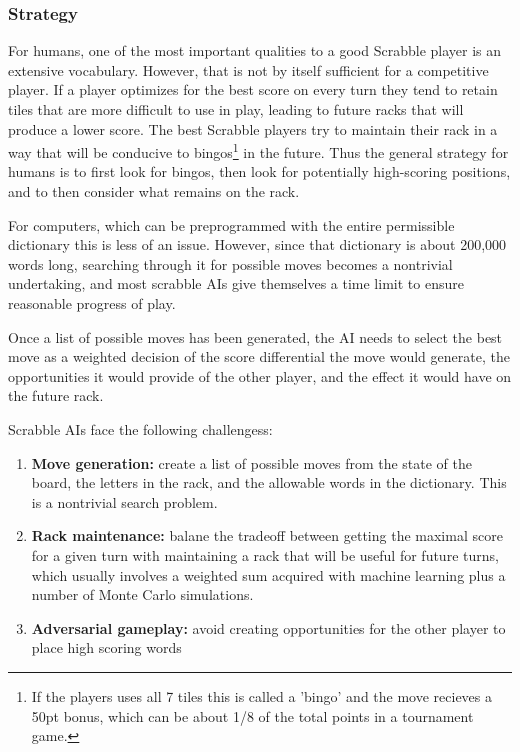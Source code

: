 \documentclass[12pt]{article}
\begin{document}
\subsubsection*{Strategy}

For humans, one of the most important qualities to a good Scrabble
player is an extensive vocabulary. However, that is not by itself
sufficient for a competitive player. If a player optimizes for the
best score on every turn they tend to retain tiles that are more
difficult to use in play, leading to future racks that will produce a
lower score. The best Scrabble players try to maintain their rack in a
way that will be conducive to bingos\footnote{If the players uses all
  7 tiles this is called a 'bingo' and the move recieves a 50pt bonus,
  which can be about 1/8 of the total points in a tournament game.} in
the future. Thus the general strategy for humans is to first look for
bingos, then look for potentially high-scoring positions, and to then
consider what remains on the rack.

For computers, which can be preprogrammed with the entire permissible
dictionary this is less of an issue. However, since that dictionary is
about 200,000 words long, searching through it for possible moves
becomes a nontrivial undertaking, and most scrabble AIs give
themselves a time limit to ensure reasonable progress of play.

Once a list of possible moves has been generated, the AI needs to select
the best move as a weighted decision of the score differential the
move would generate, the opportunities it would provide of the other
player, and the effect it would have on the future rack.

Scrabble AIs face the following challengess:

\begin{enumerate}
  \item \textbf{Move generation:} create a list of possible moves from
    the state of the board, the letters in the rack, and the allowable
    words in the dictionary. This is a nontrivial search problem.
    
  \item \textbf{Rack maintenance:} balane the tradeoff between getting
    the maximal score for a given turn with maintaining a rack that
    will be useful for future turns, which usually involves a weighted
    sum acquired with machine learning plus a number of Monte Carlo
    simulations.
    
  \item \textbf{Adversarial gameplay:} avoid creating opportunities
    for the other player to place high scoring words 
\end{enumerate}
\end{document}
